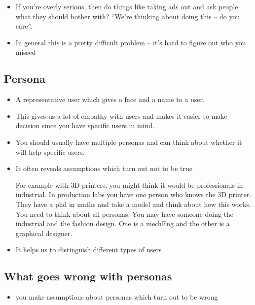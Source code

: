 \documentclass[10pt, a4paper]{article}
\begin{document}
\begin{itemize}
\begin{itemize}
\item If you're overly serious, then do things like taking ads out and ask people what they should bother with? ``We're
 thinking about doing this -- do you care''.

\item In general this is a pretty difficult problem -- it's hard to figure out who you missed

\end{itemize}

\subsection{Persona}

\begin{itemize}

\item A representative user which gives a face and a name to a user.

\item This gives us a lot of empathy with users and makes it easier to make decision since you have specific users in
mind.

\item You should usually have multiple personas and can think about whether it will help specific users.

\item It often reveals assumptions which turn out not to be true

For example with 3D printers, you might think it would be professionals in industrial. In production labs you have
one person who knows the 3D printer. They have a phd in maths and take a model and think about how this works. You
need to think about all personas. You may have someone doing the industrial and the fashion design. One is a mechEng
and the other is a graphical designer.

\item It helps us to distinguish different types of users

\end{itemize}

\subsection{What goes wrong with personas}

\begin{itemize}

\item you make assumptions about personas which turn out to be wrong


\end{itemize}
\end{itemize}
\end{document}
